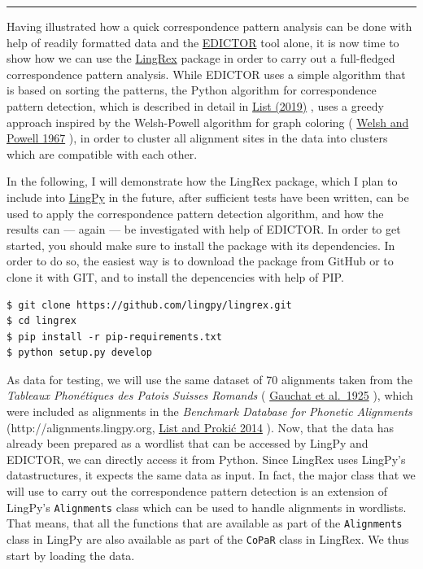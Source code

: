 \documentclass[
  a4paper,
  14pt,
  oneside,
  tablecaptionabove
]{scrbook}
\newcommand{\passthrough}[1]{#1}
\begin{document}
\begin{center}\rule{0.5\linewidth}{1pt}\end{center}

Having illustrated how a quick correspondence pattern analysis can be
done with help of readily formatted data and the
\href{http://edictor.digling.org}{EDICTOR} tool alone, it is now time to
show how we can use the
\href{https://github.com/lingpy/lingrex}{LingRex} package in order to
carry out a full-fledged correspondence pattern analysis. While EDICTOR
uses a simple algorithm that is based on sorting the patterns, the
Python algorithm for correspondence pattern detection, which is
described in detail in
\href{http://bibliography.lingpy.org?key=List2019a}{List (2019)} , uses
a greedy approach inspired by the Welsh-Powell algorithm for graph
coloring ( \href{http://bibliography.lingpy.org?key=Welsh1967}{Welsh and
Powell 1967} ), in order to cluster all alignment sites in the data into
clusters which are compatible with each other.

In the following, I will demonstrate how the LingRex package, which I
plan to include into \href{http://lingpy.org}{LingPy} in the future,
after sufficient tests have been written, can be used to apply the
correspondence pattern detection algorithm, and how the results can ---
again --- be investigated with help of EDICTOR. In order to get started,
you should make sure to install the package with its dependencies. In
order to do so, the easiest way is to download the package from GitHub
or to clone it with GIT, and to install the depencencies with help of
PIP.

\begin{lstlisting}
$ git clone https://github.com/lingpy/lingrex.git
$ cd lingrex
$ pip install -r pip-requirements.txt
$ python setup.py develop
\end{lstlisting}

As data for testing, we will use the same dataset of 70 alignments taken
from the \emph{Tableaux Phonétiques des Patois Suisses Romands} (
\href{http://bibliography.lingpy.org?key=Gauchat1925}{Gauchat et
al.~1925} ), which were included as alignments in the \emph{Benchmark
Database for Phonetic Alignments} (http://alignments.lingpy.org,
\href{http://bibliography.lingpy.org?key=List2014e}{List and Prokić
2014} ). Now, that the data has already been prepared as a wordlist that
can be accessed by LingPy and EDICTOR, we can directly access it from
Python. Since LingRex uses LingPy's datastructures, it expects the same
data as input. In fact, the major class that we will use to carry out
the correspondence pattern detection is an extension of LingPy's
\passthrough{\lstinline!Alignments!} class which can be used to handle
alignments in wordlists. That means, that all the functions that are
available as part of the \passthrough{\lstinline!Alignments!} class in
LingPy are also available as part of the \passthrough{\lstinline!CoPaR!}
class in LingRex. We thus start by loading the data.
\end{document}
